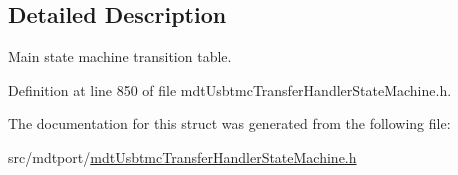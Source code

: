 \subsection{Detailed Description}
Main state machine transition table. 

Definition at line 850 of file mdt\-Usbtmc\-Transfer\-Handler\-State\-Machine.\-h.



The documentation for this struct was generated from the following file\-:\begin{DoxyCompactItemize}
\item 
src/mdtport/\hyperlink{mdt_usbtmc_transfer_handler_state_machine_8h}{mdt\-Usbtmc\-Transfer\-Handler\-State\-Machine.\-h}\end{DoxyCompactItemize}
